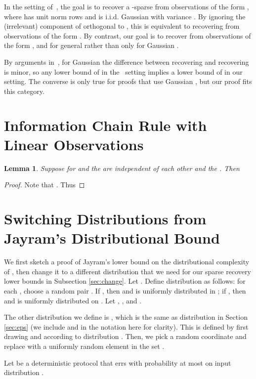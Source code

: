 \documentclass[twoside,leqno,twocolumn]{article}
\newtheorem{lemma}[theorem]{Lemma}
\begin{document}
In the setting of~\cite{ACD11}, the goal is to recover a -sparse
 from observations of the form , where  has unit norm rows
and  is i.i.d. Gaussian with variance .  By
ignoring the (irrelevant) component of  orthogonal to , this is
equivalent to recovering  from observations of the form .
By contrast, our goal is to recover  from observations of the
form , and for general  rather than only for Gaussian .

By arguments in~\cite{PW11,HIKP12}, for Gaussian  the difference
between recovering  and recovering  is minor, so any lower
bound of  in the~\cite{ACD11} setting implies a lower bound of
 in our setting.  The converse is only true for
proofs that use Gaussian , but our proof fits this category.

\section{Information Chain Rule with Linear Observations}

\begin{lemma}\label{lemma:splitentropy}
  Suppose  for  and the  are
  independent of each other and the .  Then
  
\end{lemma}
\begin{proof}
  Note that .  Thus
  
\end{proof}

\section{Switching Distributions from Jayram's Distributional Bound}\label{app:dist}
We first sketch a proof of Jayram's lower bound on the distributional
complexity of  \cite{J02}, then change it to a different distribution that
we need for our sparse recovery lower bounds in Subsection \ref{sec:change}. Let 
. Define distribution
 as follows: for each , choose a random pair . If , then  and 
 is uniformly distributed in ; if , then 
and  is uniformly distributed on . 
Let , ,  and . 

The other distribution we define is , 
which is the same as distribution  
in Section \ref{sec:eps} (we include  and  in the
notation here for clarity). This is defined by
first drawing  and  according to distribution . Then, 
we pick a random coordinate  and replace
 with a uniformly random element in the set . 

Let  be a deterministic protocol that errs with probability at most 
on input distribution . 
\end{document}

